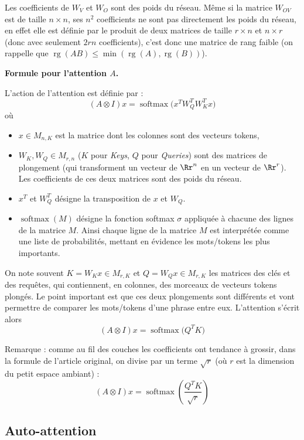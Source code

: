 \documentclass[11pt,class=report,crop=false]{standalone}
\begin{document}
Les coefficients de $W_V$ et $W_O$ sont des poids du réseau.
Même si la matrice $W_{OV}$ est de taille $n \times n$, ses $n^2$ coefficients ne sont pas directement les poids du réseau, en effet elle est définie par le produit de deux matrices de taille $r \times n$ et $n \times r$ (donc avec seulement $2rn$ coefficients), c'est donc une matrice de rang faible (on rappelle que $\operatorname{rg}(AB) \le \min( \operatorname{rg}(A) ,\operatorname{rg}(B) )$).


\bigskip

\textbf{Formule pour l'attention $A$.}

L'action de l'attention est définie par :
$$(A \otimes I) x = \operatorname{softmax} \big( x^T W_Q^T W_K^T x \big)$$
où 
\begin{itemize}
	\item $x \in M_{n,K}$ est la matrice dont les colonnes sont des vecteurs tokens,
	\item $W_K, W_Q \in M_{r,n}$ ($K$ pour \emph{Keys}, $Q$ pour \emph{Queries}) sont des matrices de plongement (qui transforment un vecteur de $\Rr^n$ en un vecteur de $\Rr^r$). Les coefficients de ces deux matrices sont des poids du réseau.
	\item $x^T$ et $W_Q^T$ désigne la transposition de $x$ et $W_Q$.
	\item $\operatorname{softmax}(M)$ désigne la fonction softmax $\sigma$ appliquée à chacune des lignes de la matrice $M$. Ainsi chaque ligne de la matrice $M$ est interprétée comme une liste de probabilités, mettant en évidence les mots/tokens les plus importants.
	
\end{itemize}


On note souvent $K = W_K x \in M_{r,K}$ et $Q = W_Q x \in M_{r,K}$ les matrices des clés et des requêtes, qui contiennent, en colonnes, des morceaux de vecteurs tokens plongés.
Le point important est que ces deux plongements sont différents et vont permettre de comparer les mots/tokens d'une phrase entre eux.
L'attention s'écrit alors
$$(A \otimes I) x = \operatorname{softmax} \big( Q^T K \big)$$

Remarque : comme au fil des couches les coefficients ont tendance à grossir, dans la formule de l'article original, on divise par un terme $\sqrt{r}$ (où $r$ est la dimension du petit espace ambiant) : 
$$(A \otimes I) x = \operatorname{softmax} \left( \frac{Q^T K}{\sqrt r} \right)$$


\subsection{Auto-attention}
\end{document}
